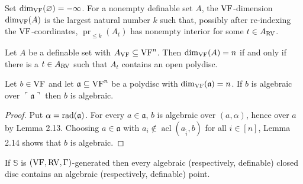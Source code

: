 \setcounter{theorem}{15}
\begin{definition}[$\VF$-dimension]
\label{s2-vf-dimension}
\leanok
{}
Set $\dim_{\mathrm{VF}}(\varnothing) = -\infty$. For a nonempty definable set $A$, the $\VF$-dimension $\dim_{\mathrm{VF}}(A)$ is the largest natural number $k$ such that, possibly after re-indexing the $\VF$-coordinates, $\operatorname{pr}_{\leq k}(A_t)$ has nonempty interior for some $t \in A_{\mathrm{RV}}$.
\end{definition}

\setcounter{theorem}{16}
\begin{lemma}
\label{full-dim-open-poly}
\leanok
{}
Let $A$ be a definable set with $A_{\mathrm{VF}} \subseteq \mathrm{VF}^n$. Then $\dim_{\mathrm{VF}}(A) = n$ if and only if there is a $t \in A_{\mathrm{RV}}$ such that $A_t$ contains an open polydisc.
\end{lemma}

\setcounter{theorem}{17}
\begin{lemma}
\label{ball-to-ac}
\leanok
{}
Let $b \in \mathrm{VF}$ and let $\mathfrak{a} \subseteq \mathrm{VF}^n$ be a polydisc with $\dim_{\mathrm{VF}}(\mathfrak{a}) = n$. If $b$ is algebraic over $\ulcorner \mathfrak{a} \urcorner$ then $b$ is algebraic.
\end{lemma}

\begin{proof}
\leanok
Put $\alpha = \operatorname{rad}(\mathfrak{a})$. For every $a \in \mathfrak{a}$, $b$ is algebraic over $(a,\alpha)$, hence over $a$ by Lemma 2.13. Choosing $a \in \mathfrak{a}$ with $a_i \notin \operatorname{acl}(a_{\tilde i}, b)$ for all $i \in [n]$, Lemma 2.14 shows that $b$ is algebraic.
\end{proof}

\setcounter{theorem}{18}
\begin{lemma}
\label{effectiveness}
\leanok
{}
If $\mathbb{S}$ is $(\mathrm{VF}, \mathrm{RV}, \Gamma)$-generated then every algebraic (respectively, definable) closed disc contains an algebraic (respectively, definable) point.
\end{lemma}

